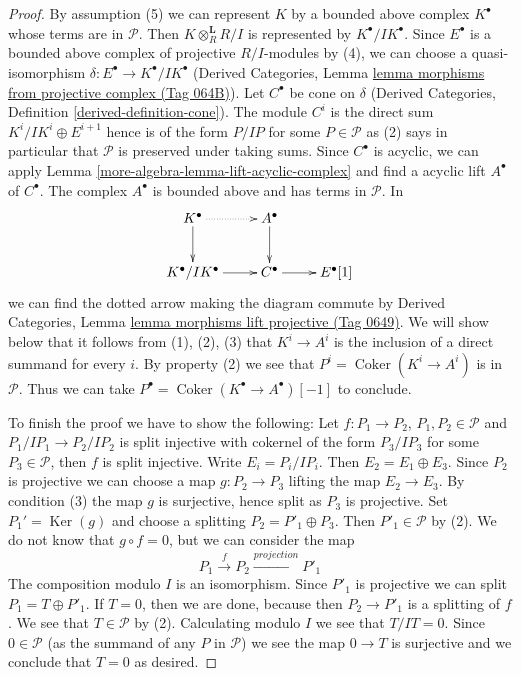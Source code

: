 \documentclass{amsart}
\theoremstyle{plain}
\theoremstyle{definition}
\theoremstyle{remark}
\numberwithin{equation}{subsection}
\def\Ker{\mathop{\mathrm{Ker}}}
\def\Coker{\mathop{\mathrm{Coker}}}
\begin{document}
\begin{proof}
By assumption (5) we can represent $K$ by a bounded above complex 
$K^\bullet$ whose terms are in $\mathcal{P}$. Then $K \otimes_R^\mathbf{L} R/I$
is represented by $K^\bullet/IK^\bullet$. Since $E^\bullet$ is
a bounded above complex of projective $R/I$-modules by (4), 
we can choose a quasi-isomorphism $\delta : E^\bullet \to K^\bullet/IK^\bullet$
(Derived Categories, Lemma
\href{https://stacks.math.columbia.edu/tag/064B}{lemma morphisms from projective complex (Tag 064B)}).
Let $C^\bullet$ be cone on $\delta$
(Derived Categories, Definition \ref{derived-definition-cone}).
The module $C^i$ is the direct sum $K^i/IK^i \oplus E^{i + 1}$
hence is of the form $P/IP$ for some $P \in \mathcal{P}$
as (2) says in particular that $\mathcal{P}$ is preserved under taking sums.
Since $C^\bullet$ is acyclic, we can apply
Lemma \ref{more-algebra-lemma-lift-acyclic-complex} and find a acyclic
lift $A^\bullet$ of $C^\bullet$. The complex $A^\bullet$ is
bounded above and has terms in $\mathcal{P}$. In
$$
\xymatrix{
K^\bullet \ar@{..>}[r] \ar[d] & A^\bullet \ar[d] \\
K^\bullet/IK^\bullet \ar[r] & C^\bullet \ar[r] & E^\bullet[1]
}
$$
we can find the dotted arrow making the diagram commute
by Derived Categories, Lemma
\href{https://stacks.math.columbia.edu/tag/0649}{lemma morphisms lift projective (Tag 0649)}.
We will show below that it follows from (1), (2), (3)
that $K^i \to A^i$ is the inclusion of a direct summand
for every $i$. By property (2) we see that $P^i = \Coker(K^i \to A^i)$
is in $\mathcal{P}$. Thus we can take
$P^\bullet = \Coker(K^\bullet \to A^\bullet)[-1]$ to conclude.

\medskip\noindent
To finish the proof we have to show the following: Let $f : P_1 \to P_2$,
$P_1, P_2 \in \mathcal{P}$ and $P_1/IP_1 \to P_2/IP_2$ is split
injective with cokernel of the form $P_3/IP_3$ for some
$P_3 \in \mathcal{P}$, then $f$ is split injective.
Write $E_i = P_i/IP_i$. Then $E_2 = E_1 \oplus E_3$.
Since $P_2$ is projective we can choose a map $g : P_2 \to P_3$
lifting the map $E_2 \to E_3$. By condition (3) the map $g$
is surjective, hence split as $P_3$ is projective. Set $P_1' = \Ker(g)$
and choose a splitting $P_2 = P'_1 \oplus P_3$. Then $P'_1 \in \mathcal{P}$
by (2). We do not know that
$g \circ f = 0$, but we can consider the map
$$
P_1 \xrightarrow{f} P_2 \xrightarrow{projection} P'_1
$$
The composition modulo $I$ is an isomorphism. Since $P'_1$ is
projective we can split $P_1 = T \oplus P'_1$. If $T = 0$, then
we are done, because then $P_2 \to P'_1$ is a splitting of $f$.
We see that $T \in \mathcal{P}$ by (2).
Calculating modulo $I$ we see that $T/IT = 0$.
Since $0 \in \mathcal{P}$ (as the summand of any $P$ in $\mathcal{P}$)
we see the map $0 \to T$ is surjective and we conclude that $T = 0$
as desired.
\end{proof}
\end{document}
